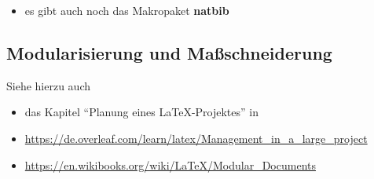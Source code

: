\begin{itemize}
\begin{itemize}
\begin{itemize}
			\item kann UTF-8
			\item man ist dadurch flexibel hinsichtlich ``style guides'' (Stilvorgaben des Verlags, Zeitschrift, Betreuer,...)
		\end{itemize}
		\item siehe auch die Dokumentation von overleaf:\\
		\url{https://www.overleaf.com/learn/latex/bibliography_management_with_biblatex}
	\end{itemize}
	In der Präambel\\
	\hspace*{0.5cm}\\
	\hspace*{0.5cm}\\
	Im Dokumentkörper:\\
	\hspace*{0.5cm}\\
	\hspace*{0.5cm}
	\item es gibt auch noch das Makropaket \textbf{natbib}
\end{itemize}





\subsection{Modularisierung und Maßschneiderung}
Siehe hierzu auch
\begin{itemize}
	\item das Kapitel ``Planung eines \LaTeX-Projektes'' in \cite[Kapitel 11]{latex1}
	\item \url{https://de.overleaf.com/learn/latex/Management_in_a_large_project}
	\item \url{https://en.wikibooks.org/wiki/LaTeX/Modular_Documents}
\end{itemize}  


